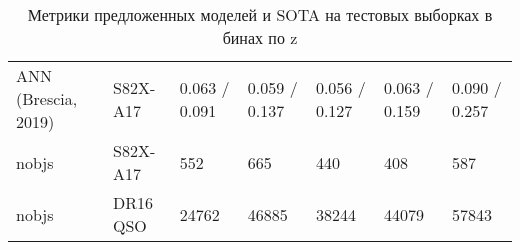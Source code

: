 \begin{table*}
\begin{tabular}{lllllll}
          ANN (Brescia, 2019) &  S82X-A17 &                    0.063 / 0.091 &                    0.059 / 0.137 &                    0.056 / 0.127 &                    0.063 / 0.159 &                    0.090 / 0.257 \\
                        nobjs &  S82X-A17 &                              552 &                              665 &                              440 &                              408 &                              587 \\
                        nobjs &  DR16 QSO &                            24762 &                            46885 &                            38244 &                            44079 &                            57843 \\
    \hline
    \end{tabular}
    
    \caption{Метрики предложенных моделей и SOTA на тестовых выборках в бинах по z}
    \label{tab:metrics-rmag}
\end{table*}


